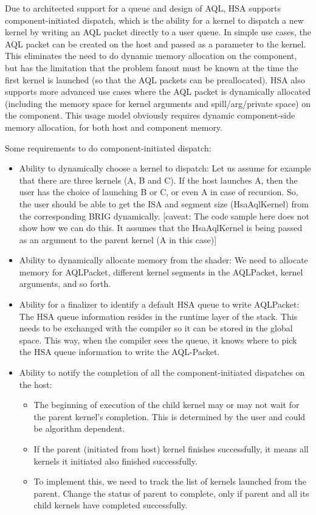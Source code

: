 \documentclass[final]{book}
\begin{document}
Due to architected support for a queue and design of AQL, HSA supports
component-initiated dispatch, which is the ability for a kernel to dispatch a
new kernel by writing an AQL packet directly to a user queue. In simple use
cases, the AQL packet can be created on the host and passed as a parameter to
the kernel. This eliminates the need to do dynamic memory allocation on the
component, but has the limitation that the problem fanout must be known at the
time the first kernel is launched (so that the AQL packets can be
preallocated). HSA also supports more advanced use cases where the AQL packet is
dynamically allocated (including the memory space for kernel arguments and
spill/arg/private space) on the component. This usage model obviously requires
dynamic component-side memory allocation, for both host and component memory.

Some requirements to do component-initiated dispatch:
\begin{itemize}
\item Ability to dynamically choose a kernel to dispatch: Let us assume for
  example that there are three kernels (A, B and C). If the host launches A,
  then the user has the choice of launching B or C, or even A in case of
  recursion. So, the user should be able to get the ISA and segment size
  (Hsa\-Aql\-Kernel) from the corresponding BRIG dynamically. \mbox{[}caveat:
  The code sample here does not show how we can do this. It assumes that the
  Hsa\-Aql\-Kernel is being passed as an argument to the parent kernel (A in
  this case)\mbox{]}

\item Ability to dynamically allocate memory from the shader: We need to
  allocate memory for AQL\-Packet, different kernel segments in the AQL\-Packet,
  kernel arguments, and so forth.

\item Ability for a finalizer to identify a default HSA queue to write
  AQL\-Packet: The HSA queue information resides in the runtime layer of the
  stack. This needs to be exchanged with the compiler so it can be stored in the
  global space. This way, when the compiler sees the queue, it knows where to
  pick the HSA queue information to write the AQL-Packet.

\item Ability to notify the completion of all the component-initiated
  dispatches on the host:

\begin{itemize}
\item The beginning of execution of the child kernel may or may not wait for the
  parent kernel's completion. This is determined by the user and could be
  algorithm dependent.
\item If the parent (initiated from host) kernel finishes successfully, it means
  all kernels it initiated also finished successfully.
\item To implement this, we need to track the list of kernels launched from the
  parent. Change the status of parent to complete, only if parent and all its
  child kernels have completed successfully.
\end{itemize}
\end{itemize}
\end{document}

